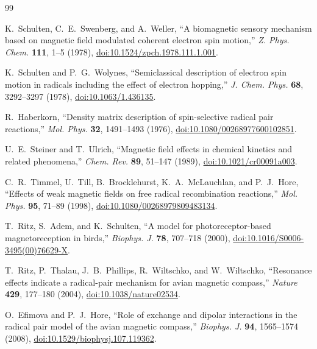 \documentclass[twocolumn,10pt,amsmath,amssymb,floatfix]{revtex4-2}
\theoremstyle{plain}
\theoremstyle{definition}
\begin{document}
{\raggedright
\setlength{\bibsep}{0pt plus 0.3ex}
\begin{thebibliography}{99}

K.~Schulten, C.~E.~Swenberg, and A.~Weller,
``A biomagnetic sensory mechanism based on magnetic field modulated coherent electron spin motion,''
\emph{Z. Phys. Chem.} \textbf{111}, 1--5 (1978),
\href{https://doi.org/10.1524/zpch.1978.111.1.001}{doi:10.1524/zpch.1978.111.1.001}.

K.~Schulten and P.~G.~Wolynes,
``Semiclassical description of electron spin motion in radicals including the effect of electron hopping,''
\emph{J. Chem. Phys.} \textbf{68}, 3292--3297 (1978),
\href{https://doi.org/10.1063/1.436135}{doi:10.1063/1.436135}.

R.~Haberkorn,
``Density matrix description of spin-selective radical pair reactions,''
\emph{Mol. Phys.} \textbf{32}, 1491--1493 (1976),
\href{https://doi.org/10.1080/00268977600102851}{doi:10.1080/00268977600102851}.

U.~E.~Steiner and T.~Ulrich,
``Magnetic field effects in chemical kinetics and related phenomena,''
\emph{Chem. Rev.} \textbf{89}, 51--147 (1989),
\href{https://doi.org/10.1021/cr00091a003}{doi:10.1021/cr00091a003}.

C.~R.~Timmel, U.~Till, B.~Brocklehurst, K.~A.~McLauchlan, and P.~J.~Hore,
``Effects of weak magnetic fields on free radical recombination reactions,''
\emph{Mol. Phys.} \textbf{95}, 71--89 (1998),
\href{https://doi.org/10.1080/00268979809483134}{doi:10.1080/00268979809483134}.

T.~Ritz, S.~Adem, and K.~Schulten,
``A model for photoreceptor-based magnetoreception in birds,''
\emph{Biophys. J.} \textbf{78}, 707--718 (2000),
\href{https://doi.org/10.1016/S0006-3495(00)76629-X}{doi:10.1016/S0006-3495(00)76629-X}.

T.~Ritz, P.~Thalau, J.~B.~Phillips, R.~Wiltschko, and W.~Wiltschko,
``Resonance effects indicate a radical-pair mechanism for avian magnetic compass,''
\emph{Nature} \textbf{429}, 177--180 (2004),
\href{https://doi.org/10.1038/nature02534}{doi:10.1038/nature02534}.

O.~Efimova and P.~J.~Hore,
``Role of exchange and dipolar interactions in the radical pair model of the avian magnetic compass,''
\emph{Biophys. J.} \textbf{94}, 1565--1574 (2008),
\href{https://doi.org/10.1529/biophysj.107.119362}{doi:10.1529/biophysj.107.119362}.


\end{thebibliography}}
\end{document}
